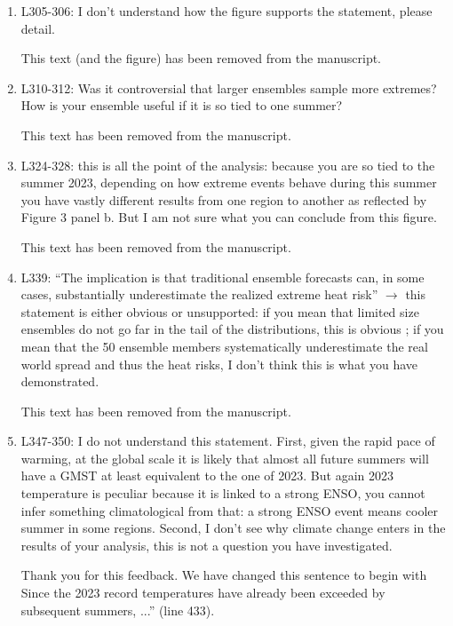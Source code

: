 \documentclass[11pt]{article}
\newcommand{\newTxt}{\textcolor{cadmiumgreen}}
\begin{document}
\begin{enumerate}
    \newTxt{We apologize for any confusion. The referenced text (and the entire section) has been removed from the manuscript.}
    
    \item L305-306: I don’t understand how the figure supports the statement, please detail.

    \newTxt{This text (and the figure) has been removed from the manuscript.}

    \item L310-312: Was it controversial that larger ensembles sample more extremes? How is your ensemble useful if it is so tied to one summer?

        \newTxt{This text has been removed from the manuscript.}

    \item L324-328: this is all the point of the analysis: because you are so tied to the summer 2023, depending on how extreme events behave during this summer you have vastly different results from one region to another as reflected by Figure 3 panel b. But I am not sure what you can conclude from this figure.

    \newTxt{This text has been removed from the manuscript.}

    \item L339: “The implication is that traditional ensemble forecasts can, in some cases, substantially underestimate the realized extreme heat risk” $\rightarrow$ this statement is either obvious or unsupported: if you mean that limited size ensembles do not go far in the tail of the distributions, this is obvious ; if you mean that the 50 ensemble members systematically underestimate the real world spread and thus the heat risks, I don’t think this is what you have demonstrated.

        \newTxt{This text has been removed from the manuscript.}

    \item L347-350: I do not understand this statement. First, given the rapid pace of warming, at the global scale it is likely that almost all future summers will have a GMST at least equivalent to the one of 2023. But again 2023 temperature is peculiar because it is linked to a strong ENSO, you cannot infer something climatological from that: a strong ENSO event means cooler summer in some regions. Second, I don’t see why climate change enters in the results of your analysis, this is not a question you have investigated. 

    \newTxt{Thank you for this feedback. We have changed this sentence to begin with Since the 2023 record temperatures have already been exceeded by subsequent summers, ...'' (line 433).}
    

\end{enumerate}
\end{document}

